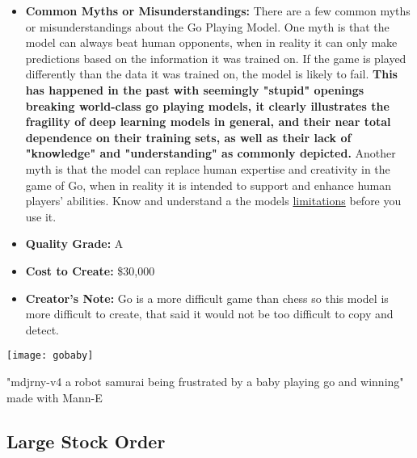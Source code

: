 \begin{itemize}
    \item \textbf{Common Myths or Misunderstandings:} There are a few common myths or misunderstandings about the Go Playing Model. One myth is that the model can always beat human opponents, when in reality it can only make predictions based on the information it was trained on. If the game is played differently than the data it was trained on, the model is likely to fail. \textbf{This has happened in the past with seemingly "stupid" openings breaking world-class go playing models, it clearly illustrates the fragility of deep learning models in general, and their near total dependence on their training sets, as well as their lack of "knowledge" and "understanding" as commonly depicted.} Another myth is that the model can replace human expertise and creativity in the game of Go, when in reality it is intended to support and enhance human players' abilities. Know and understand a the models \hyperref[sec:limits]{limitations} before you use it.
    \item \textbf{Quality Grade:} A
    \item \textbf{Cost to Create:} \$30,000
    \item \textbf{Creator's Note:} Go is a more difficult game than chess so this model is more difficult to create, that said it would not be too difficult to copy and detect.
\end{itemize}

\begin{marginfigure}[-5.5cm]
        \texttt{[image: gobaby]}
        \caption{"mdjrny-v4 a robot samurai being frustrated by a baby playing go and winning" made with Mann-E}
\end{marginfigure}


\subsection{Large Stock Order}

